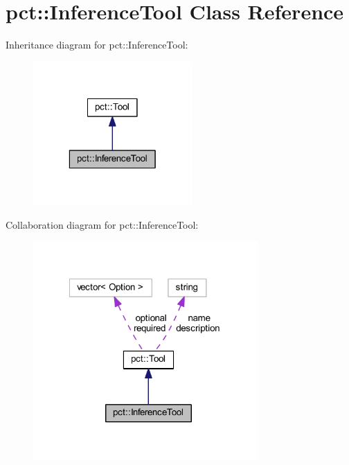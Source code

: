 \hypertarget{classpct_1_1_inference_tool}{\section{pct\-:\-:Inference\-Tool Class Reference}
\label{classpct_1_1_inference_tool}
}


Inheritance diagram for pct\-:\-:Inference\-Tool\-:\nopagebreak
\begin{figure}[H]
\begin{center}
\leavevmode
\includegraphics[width=172pt]{classpct_1_1_inference_tool__inherit__graph}
\end{center}
\end{figure}


Collaboration diagram for pct\-:\-:Inference\-Tool\-:\nopagebreak
\begin{figure}[H]
\begin{center}
\leavevmode
\includegraphics[width=243pt]{classpct_1_1_inference_tool__coll__graph}
\end{center}
\end{figure}
